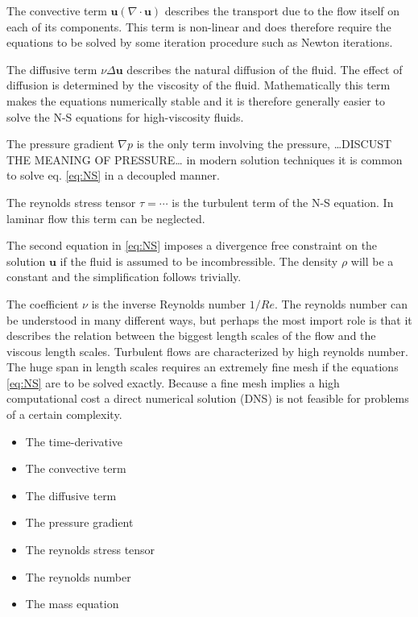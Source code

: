 The convective term $\mathbf{u} (\nabla \cdot \mathbf{u})$ describes the transport due to the flow itself on each of its components. 
This term is non-linear and does therefore require the equations to be solved by some iteration procedure such as Newton iterations.

The diffusive term $\nu \Delta \mathbf{u}$ describes the natural diffusion of the fluid. The effect of diffusion is determined by the 
viscosity of the fluid. Mathematically this term makes the equations numerically stable and it is therefore generally easier
to solve the N-S equations for high-viscosity fluids. 

The pressure gradient $\nabla p$ is the only term involving the pressure, \ldots DISCUST THE MEANING OF PRESSURE\ldots 
in modern solution techniques it is common to solve eq. \ref{eq:NS} 
in a decoupled manner. 

The reynolds stress tensor $\tau = \cdots$ is the turbulent term of the N-S equation. In laminar flow this term can 
be neglected.

The second equation in \ref{eq:NS} imposes a divergence free constraint on the solution $\mathbf{u}$ if the fluid is 
assumed to be incombressible. The density $\rho$ will be a constant and the simplification follows trivially.

The coefficient $\nu$ is the inverse Reynolds number $1/Re$. The reynolds number can be understood in many different ways, but perhaps the most 
import role is that it describes the relation between the biggest length scales of the flow and the viscous length scales. Turbulent flows are
characterized by high reynolds number. The huge span in length scales requires an extremely fine mesh if the equations \ref{eq:NS} 
are to be solved exactly. Because a fine mesh implies a high computational cost a direct numerical solution (DNS) is not feasible for 
problems of a certain complexity.

\begin{itemize}
\item The time-derivative
\item The convective term 
\item The diffusive term 
\item The pressure gradient
\item The reynolds stress tensor
\item The reynolds number
\item The mass equation
\end{itemize}


